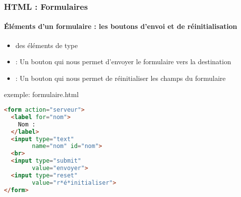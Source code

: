 \documentclass[xcolor=table]{beamer}
\begin{document}
\begin{frame}[fragile]
\frametitle{HTML : Formulaires}
\framesubtitle{Éléments d'un formulaire : les boutons d'envoi et de réinitialisation}

\begin{minipage}{0.59\textwidth} 
	\begin{itemize}
		\item des éléments de type 
		\item {} : Un bouton qui nous permet d'envoyer le formulaire vers la destination
		\item {} : Un bouton qui nous permet de réinitialiser les champs du formulaire
	\end{itemize}
\end{minipage}
%
\begin{minipage}{0.4\textwidth}
\begin{exampleblock}{exemple: formulaire.html}
\lstset{escapeinside=**}
\scriptsize\bfseries\vspace{-6pt}
\begin{lstlisting}[language={html}]
<form action="serveur">
  <label for="nom">
    Nom : 
  </label>
  <input type="text" 
        name="nom" id="nom">
  <br>
  <input type="submit" 
        value="envoyer">
  <input type="reset" 
        value="r*é*initialiser">
</form>
\end{lstlisting}\vspace{-6pt}
\end{exampleblock}
\end{minipage}

\end{frame}
\end{document}
